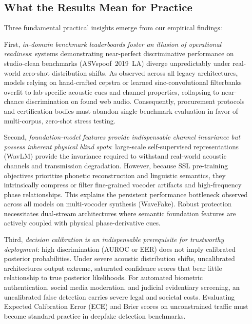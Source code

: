
\subsection{What the Results Mean for Practice}

Three fundamental practical insights emerge from our empirical findings:

First, \emph{in-domain benchmark leaderboards foster an illusion of operational readiness}: systems demonstrating near-perfect discriminative performance on studio-clean benchmarks (ASVspoof~2019~LA) diverge unpredictably under real-world zero-shot distribution shifts. As observed across all legacy architectures, models relying on hand-crafted cepstra or learned sinc-convolutional filterbanks overfit to lab-specific acoustic cues and channel properties, collapsing to near-chance discrimination on found web audio. Consequently, procurement protocols and certification bodies must abandon single-benchmark evaluation in favor of multi-corpus, zero-shot stress testing.

Second, \emph{foundation-model features provide indispensable channel invariance but possess inherent physical blind spots}: large-scale self-supervised representations (WavLM) provide the invariance required to withstand real-world acoustic channels and transmission degradation. However, because SSL pre-training objectives prioritize phonetic reconstruction and linguistic semantics, they intrinsically compress or filter fine-grained vocoder artifacts and high-frequency phase relationships. This explains the persistent performance bottleneck observed across all models on multi-vocoder synthesis (WaveFake). Robust protection necessitates dual-stream architectures where semantic foundation features are actively coupled with physical phase-derivative cues.

Third, \emph{decision calibration is an indispensable prerequisite for trustworthy deployment}: high discrimination (AUROC or EER) does not imply calibrated posterior probabilities. Under severe acoustic distribution shifts, uncalibrated architectures output extreme, saturated confidence scores that bear little relationship to true posterior likelihoods. For automated biometric authentication, social media moderation, and judicial evidentiary screening, an uncalibrated false detection carries severe legal and societal costs. Evaluating Expected Calibration Error (ECE) and Brier scores on unconstrained traffic must become standard practice in deepfake detection benchmarks.

